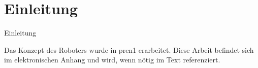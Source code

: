 \section{Einleitung}

Einleitung


Das Konzept des Roboters wurde in \acrfull{pren1} erarbeitet. Diese Arbeit befindet sich im elektronischen Anhang und wird, wenn nötig im Text referenziert.